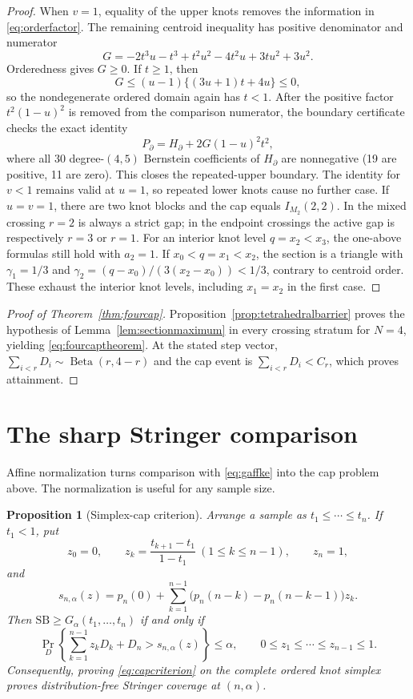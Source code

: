 \documentclass[11pt]{article}
\newtheorem{proposition}[theorem]{Proposition}
\theoremstyle{definition}
\newcommand{\SB}{\mathrm{SB}}
\begin{document}
\begin{proof}
When $v=1$, equality of the upper knots removes the information in
\eqref{eq:orderfactor}.  The remaining centroid inequality has positive
denominator and numerator
\[
 G=-2t^3u-t^3+t^2u^2-4t^2u+3tu^2+3u^2.
\]
Orderedness gives $G\ge0$.  If $t\ge1$, then
\[
 G\le(u-1)\{(3u+1)t+4u\}\le0,
\]
so the nondegenerate ordered domain again has $t<1$.  After the positive
factor $t^2(1-u)^2$ is removed from the comparison numerator, the boundary
certificate checks the exact identity
\[
 P_\partial=H_\partial+2G(1-u)^2t^2,
\]
where all 30 degree-$(4,5)$ Bernstein coefficients of $H_\partial$ are
nonnegative (19 are positive, 11 are zero).  This closes the repeated-upper
boundary. The identity for $v<1$ remains valid at $u=1$, so
repeated lower knots cause no further case. If $u=v=1$, there are two
knot blocks and the cap equals $I_{M_2}(2,2)$. In the mixed crossing
$r=2$ is always a strict gap; in the endpoint crossings the active gap is
respectively $r=3$ or $r=1$. For an interior knot level $q=x_2<x_3$, the one-above formulas still
hold with $a_2=1$. If $x_0<q=x_1<x_2$, the section is a triangle with
$\gamma_1=1/3$ and $\gamma_2=(q-x_0)/(3(x_2-x_0))<1/3$,
contrary to centroid order. These exhaust the interior knot levels,
including $x_1=x_2$ in the first case.
\end{proof}

\begin{proof}[Proof of Theorem~\ref{thm:fourcap}]
Proposition~\ref{prop:tetrahedralbarrier} proves the hypothesis of
Lemma~\ref{lem:sectionmaximum} in every crossing stratum for $N=4$, yielding
\eqref{eq:fourcaptheorem}.  At the stated step vector,
$\sum_{i<r}D_i\sim\operatorname{Beta}(r,4-r)$ and the cap event is
$\sum_{i<r}D_i<C_r$, which proves attainment.
\end{proof}

\section{The sharp Stringer comparison}

Affine normalization turns comparison with \eqref{eq:gaffke} into the
cap problem above. The normalization is useful for any sample size.

\begin{proposition}[Simplex-cap criterion]\label{prop:capcriterion}
Arrange a sample as $t_1\le\cdots\le t_n$. If $t_1<1$, put
\[
z_0=0,\qquad z_k=\frac{t_{k+1}-t_1}{1-t_1}\ (1\le k\le n-1),
\qquad z_n=1,
\]
and
\[
s_{n,\alpha}(z)=p_n(0)+\sum_{k=1}^{n-1}
 \bigl(p_n(n-k)-p_n(n-k-1)\bigr)z_k.
\]
Then $\SB\ge G_\alpha(t_1,\ldots,t_n)$ if and only if
\begin{equation}\label{eq:capcriterion}
 \Pr_D\!\left\{\sum_{k=1}^{n-1}z_kD_k+D_n
        >s_{n,\alpha}(z)\right\}\le\alpha,
 \qquad 0\le z_1\le\cdots\le z_{n-1}\le1.
\end{equation}
Consequently, proving \eqref{eq:capcriterion} on the complete ordered
knot simplex proves distribution-free Stringer coverage at $(n,\alpha)$.
\end{proposition}
\end{document}
